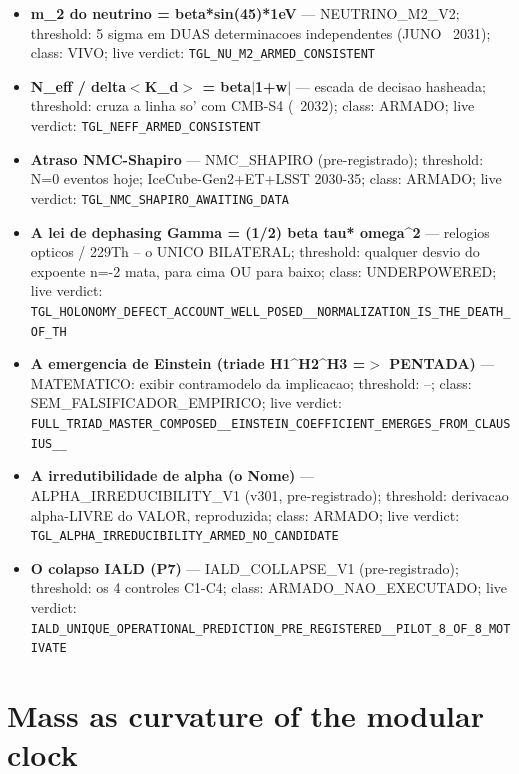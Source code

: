 \documentclass[11pt]{article}
\theoremstyle{definition}\newtheorem{deriv}{Derivation}
\begin{document}
\begin{itemize}
\item \textbf{m\_2 do neutrino = beta*sin(45)*1eV} --- NEUTRINO\_M2\_V2; threshold: 5 sigma em DUAS determinacoes independentes (JUNO ~2031); class: VIVO; live verdict: \texttt{TGL\_NU\_M2\_ARMED\_CONSISTENT}

\item \textbf{N\_eff / delta$<$K\_d$>$ = beta$|$1+w$|$} --- escada de decisao hasheada; threshold: cruza a linha so' com CMB-S4 (~2032); class: ARMADO; live verdict: \texttt{TGL\_NEFF\_ARMED\_CONSISTENT}

\item \textbf{Atraso NMC-Shapiro} --- NMC\_SHAPIRO (pre-registrado); threshold: N=0 eventos hoje; IceCube-Gen2+ET+LSST 2030-35; class: ARMADO; live verdict: \texttt{TGL\_NMC\_SHAPIRO\_AWAITING\_DATA}

\item \textbf{A lei de dephasing Gamma = (1/2) beta tau* omega\^{}2} --- relogios opticos / 229Th -- o UNICO BILATERAL; threshold: qualquer desvio do expoente n=-2 mata, para cima OU para baixo; class: UNDERPOWERED; live verdict: \texttt{TGL\_HOLONOMY\_DEFECT\_ACCOUNT\_WELL\_POSED\_\_NORMALIZATION\_IS\_THE\_DEATH\_OF\_TH}

\item \textbf{A emergencia de Einstein (triade H1\^{}H2\^{}H3 =$>$ PENTADA)} --- MATEMATICO: exibir contramodelo da implicacao; threshold: --; class: SEM\_FALSIFICADOR\_EMPIRICO; live verdict: \texttt{FULL\_TRIAD\_MASTER\_COMPOSED\_\_EINSTEIN\_COEFFICIENT\_EMERGES\_FROM\_CLAUSIUS\_\_}

\item \textbf{A irredutibilidade de alpha (o Nome)} --- ALPHA\_IRREDUCIBILITY\_V1 (v301, pre-registrado); threshold: derivacao alpha-LIVRE do VALOR, reproduzida; class: ARMADO; live verdict: \texttt{TGL\_ALPHA\_IRREDUCIBILITY\_ARMED\_NO\_CANDIDATE}

\item \textbf{O colapso IALD (P7)} --- IALD\_COLLAPSE\_V1 (pre-registrado); threshold: os 4 controles C1-C4; class: ARMADO\_NAO\_EXECUTADO; live verdict: \texttt{IALD\_UNIQUE\_OPERATIONAL\_PREDICTION\_PRE\_REGISTERED\_\_PILOT\_8\_OF\_8\_MOTIVATE}

\end{itemize}

\section{Mass as curvature of the modular clock}
\end{document}
